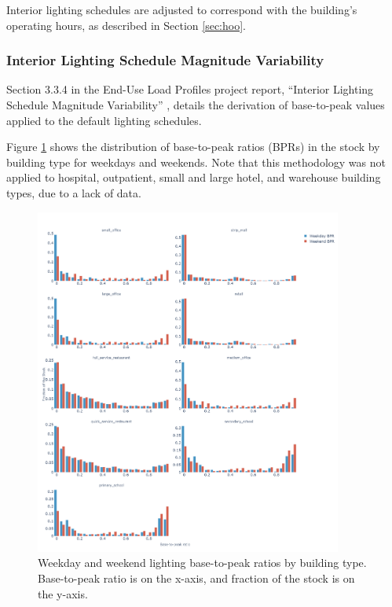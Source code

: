 Interior lighting schedules are adjusted to correspond with the building's operating hours, as described in Section \ref{sec:hoo}.

\subsubsection{Interior Lighting Schedule Magnitude Variability}
Section 3.3.4 in the End-Use Load Profiles project report, ``Interior Lighting Schedule Magnitude Variability'' \citep{eulp_method_2022}, details the derivation of base-to-peak values applied to the default lighting schedules.

Figure \ref{fig:ltg_bpr} shows the distribution of base-to-peak ratios (BPRs) in the stock by building type for weekdays and weekends.  Note that this methodology was not applied to hospital, outpatient, small and large hotel, and warehouse building types, due to a lack of data.

\begin{figure}
    \centering \includegraphics[width=0.9\textwidth]{figures/ltg_sch_bpr.png}
    \caption[Weekday and weekend lighting base-to-peak ratios by building type]{Weekday and weekend lighting base-to-peak ratios by building type. Base-to-peak ratio is on the x-axis, and fraction of the stock is on the y-axis.}
    \label{fig:ltg_bpr}
\end{figure}

